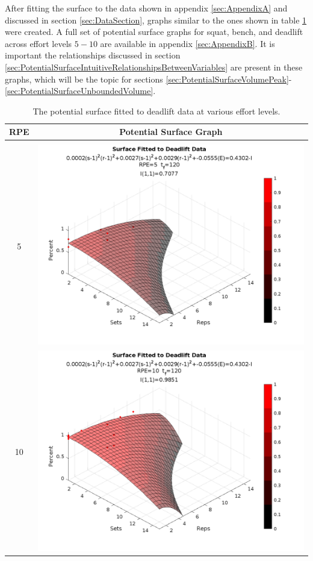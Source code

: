 After fitting the surface to the data shown in appendix \ref{sec:AppendixA} and discussed in section \ref{sec:DataSection}, graphs similar to the ones shown in table \ref{tab:DeadliftPotentialSurfaceAcrossEffort} were created. A full set of potential surface graphs for squat, bench, and deadlift across effort levels $5-10$ are available in appendix \ref{sec:AppendixB}. It is important the relationships discussed in section \ref{sec:PotentialSurfaceIntuitiveRelationshipsBetweenVariables} are present in these graphs, which will be the topic for sections \ref{sec:PotentialSurfaceVolumePeak}-\ref{sec:PotentialSurfaceUnboundedVolume}.

\begin{table}[]
    \centering
    \begin{tabular}{c|c}
        RPE & Potential Surface Graph \\
        \hline \\
        
        5 &
        \includegraphics[width=139mm]{DeadliftSurface/5.png} \\
        10 &
        \includegraphics[width=139mm]{DeadliftSurface/10.png} \\
    \end{tabular}
    \caption{The potential surface fitted to deadlift data at various effort levels.}
    \label{tab:DeadliftPotentialSurfaceAcrossEffort}
\end{table}

